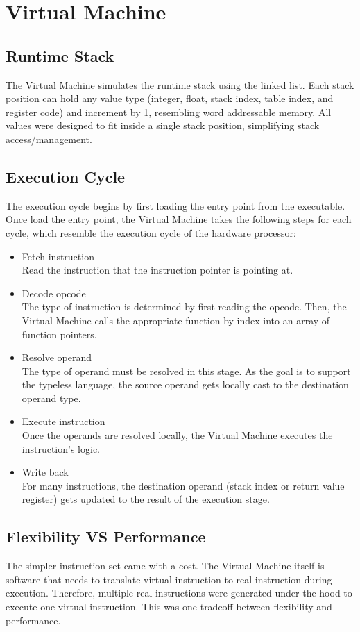 \documentclass[manuscript,screen,nonacm]{acmart}
\begin{document}
\section{Virtual Machine}

\subsection{Runtime Stack}
The Virtual Machine simulates the runtime stack using the linked list. Each stack position can hold any value type (integer, float, stack index, table index, and register code) and increment by 1, resembling word addressable memory. All values were designed to fit inside a single stack position, simplifying stack access/management. 

\subsection{Execution Cycle}
The execution cycle begins by first loading the entry point from the executable. Once load the entry point, the Virtual Machine takes the following steps for each cycle, which resemble the execution cycle of the hardware processor:
\begin{itemize}
    \item Fetch instruction \\
	Read the instruction that the instruction pointer is pointing at.
    \item Decode opcode \\
	The type of instruction is determined by first reading the opcode. Then, the Virtual Machine calls the appropriate function by index into an array of function pointers.
    \item Resolve operand \\
	The type of operand must be resolved in this stage. As the goal is to support the typeless language, the source operand gets locally cast to the destination operand type. 
    \item Execute instruction \\
	Once the operands are resolved locally, the Virtual Machine executes the instruction's logic.
    \item Write back \\
	For many instructions, the destination operand (stack index or return value register) gets updated to the result of the execution stage. 
\end{itemize}

\subsection{Flexibility VS Performance}
The simpler instruction set came with a cost. The Virtual Machine itself is software that needs to translate virtual instruction to real instruction during execution. Therefore, multiple real instructions were generated under the hood to execute one virtual instruction. This was one tradeoff between flexibility and performance.
\end{document}
